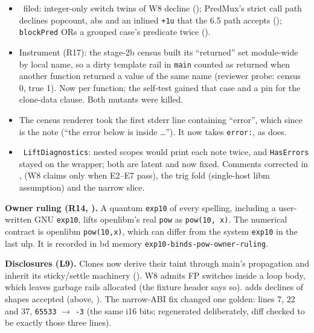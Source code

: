 \begin{itemize}
immediate UB on basis states the guard excluded). Provable flags (\texttt{nneg}
casts, \texttt{trunc nuw}) are also still treated as poison. The census below
contains none of these shapes.
\item \fpreexisting\ filed: integer-only switch twins of W8 decline
(); PredMux's strict call path declines popcount, abs and an inlined
\texttt{+1u} that the 6.5 path accepts (); \texttt{blockPred} ORs a
grouped case's predicate twice ().
\item Instrument (R17): the stage-2b census built its ``returned'' set module-wide
by local name, so a dirty template rail in \texttt{main} counted as returned when
another function returned a value of the same name (reviewer probe: census 0, true
1). Now per function; the self-test gained that case and a pin for the clone-data
clause. Both mutants were killed.
\item The census renderer took the first stderr line containing ``error'', which
since  is the note (``the error below is inside \dots''). It now takes
\texttt{error:}, as  does.
\item \fdoc\ \texttt{LiftDiagnostics}: nested scopes would print each note twice, and
\texttt{HasErrors} stayed on the wrapper; both are latent and now fixed. Comments
corrected in ,  (W8 claims only when
E2--E7 pass), the trig fold (single-host libm assumption) and the narrow slice.
\end{itemize}

\textbf{Owner ruling (R14, ).} A quantum \texttt{exp10} of every spelling,
including a user-written GNU \texttt{exp10}, lifts openlibm's real \texttt{pow}
as \texttt{pow(10, x)}. The numerical contract is openlibm \texttt{pow(10,x)}, which
can differ from the system \texttt{exp10} in the last ulp. It is recorded in bd
memory \texttt{exp10-binds-pow-owner-ruling}.

\textbf{Disclosures (L9).} Clones now derive their taint through main's propagation
and inherit its sticky/settle machinery (). W8 admits FP switches
inside a loop body, which leaves garbage rails allocated (the fixture header says
so).  adds declines of shapes  accepted (above,
). The narrow-ABI fix changed one golden:
 lines 7, 22 and 37, \texttt{65533}
$\to$ \texttt{-3} (the same i16 bits; regenerated deliberately, diff checked to be
exactly those three lines).

